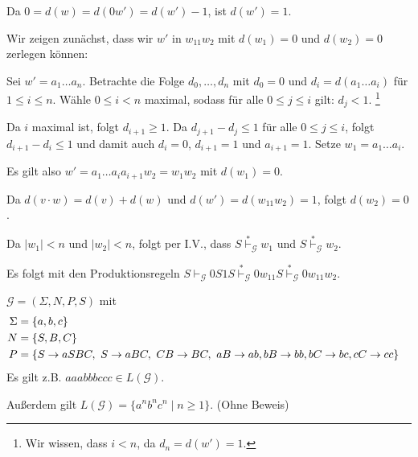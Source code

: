 \begin{Bsp}
\begin{description}[font=\normalfont]
  Da $0 = d(w) = d(0w') = d(w') - 1$, ist $d(w') = 1$.
  
  \medskip

  Wir zeigen zunächst, dass wir $w'$ in $w_11w_2$ mit $d(w_1) = 0$ und $d(w_2) = 0$ zerlegen können:

    Sei $w' = a_1 \ldots a_n$.
    Betrachte die Folge $d_0,\ldots,d_n$ mit $d_0 = 0$ und $d_i = d(a_1\ldots a_i)$ für $1 \le i \leq n$.
    Wähle $0 \le i < n$ maximal, sodass für alle $0 \le j \le i$ gilt: $d_j < 1$.%
    \footnote{Wir wissen, dass $i < n$, da $d_n = d(w') = 1$.}

    Da $i$ maximal ist, folgt $d_{i+1} \ge 1$.
    Da $d_{j+1} - d_j \le 1$ für alle $0 \le j \le i$, folgt $d_{i+1} - d_i \le 1$ und damit auch $d_i = 0$, $d_{i+1} = 1$ und $a_{i+1} = 1$.
    Setze $w_1 = a_1\ldots a_{i}$.

    Es gilt also $w' = a_1\ldots a_{i}a_{i+1}w_2 = w_1w_2$ mit $d(w_1) = 0$.

    Da $d(v \cdot w) = d(v) + d(w)$ und $d(w') = d(w_11w_2) = 1$, folgt $d(w_2) = 0$.
  \bigskip
  \goodbreak

  Da $|w_1| < n$ und $|w_2| < n$, folgt per I.V., dass $S \stackrel{*}{\vdash}_{\mathcal{G}} w_1$ und $S \stackrel{*}{\vdash}_{\mathcal{G}} w_2$.

  Es folgt mit den Produktionsregeln $S \vdash_{\mathcal{G}} 0S1S \stackrel{*}{\vdash}_{\mathcal{G}} 0w_11S \stackrel{*}{\vdash}_{\mathcal{G}} 0w_11w_2$.
  \qedhere
\end{description}
\end{Bsp}

\begin{Bsp} $\mathcal{G}=(\Sigma,N,P,S)$ mit
	\begin{align*}
		\Sigma &= \{a,b,c\}\\
		N &= \{S,B,C\}\\
		P &= 
		\begin{aligned}[t]
			 \{ &S \-> aSBC,\ S\->aBC,\ CB\-> BC,\ aB\-> ab,
			bB\-> bb, bC\-> bc, cC\-> cc \}
		\end{aligned}
	\end{align*}
Es gilt z.B. $aaabbbccc\in L(\mathcal{G})$.

Außerdem gilt $L(\mathcal{G}) =  \{ a^nb^nc^n \mid n\geq 1 \}$. (Ohne Beweis)
\end{Bsp}

